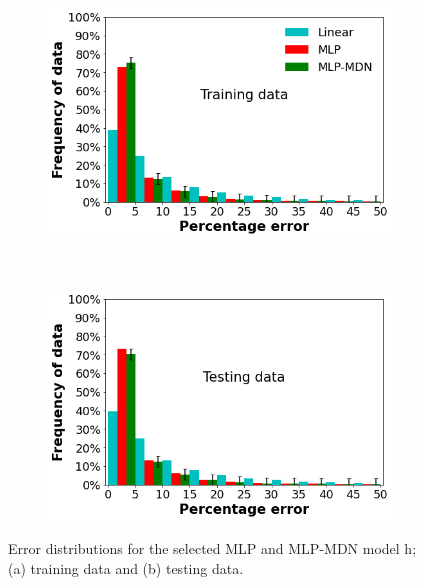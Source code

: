 \documentclass[a4paper,fleqn]{cas-dc}
\begin{document}
\begin{figure}[h!]
    \begin{subfigure}{0.5\textwidth}
    \includegraphics[width=1\textwidth]{OVERALL_TRAIN}
    \caption{}
    \end{subfigure}\\
        \begin{subfigure}{0.5\textwidth}
    \includegraphics[width=1\textwidth]{OVERALL_TEST}
    \caption{}
    \end{subfigure}
    \caption{Error distributions for the selected MLP and MLP-MDN model h; (a) training data and (b) testing data.}\label{fig_frequency_data}
\end{figure}
\end{document}
